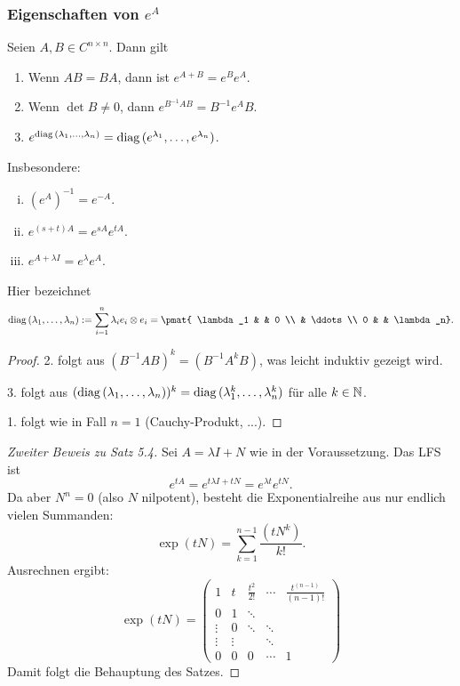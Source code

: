 \subsubsection{Eigenschaften von  \texorpdfstring{$e^A$}{exp(A)}}
\begin{thm}
  Seien $A, B \in C^{n \times n}$. Dann gilt
  \begin{enumerate}
  \item Wenn $AB=BA$, dann ist $e^{A+B} = e^B e^A$.
  \item Wenn $\det B \ne 0$, dann $e^{B^{-1}AB}= B^{-1}e^A B$.
  \item $e^{\mathrm{diag}\,(\lambda_1, \ldots, \lambda_n)} = \mathrm{diag}\,(e^{\lambda_1},
    \ldots, e^{\lambda_n})$.
  \end{enumerate}
  Insbesondere:
  \begin{enumerate}[(i)]
  \item $(e^A)^{-1}= e^{-A}$.
  \item $e^{(s+t)A}= e^{sA}e^{tA}$.
  \item $e^{A+\lambda I}= e^\lambda e^A$.
  \end{enumerate}
\end{thm}
Hier bezeichnet
\[ \diag(\lambda_1, \ldots, \lambda_n) := \sum_{i=1}^n \lambda_i e_i \otimes
  e_i = \pmat{ \lambda_1 & & 0 \\ & \ddots \\ 0 & & \lambda_n}. \]

\begin{proof}
  2. folgt aus $(B^{-1}AB)^k = (B^{-1}A^kB)$, was leicht induktiv gezeigt wird.

  3. folgt aus $(\mathrm{diag}\,(\lambda_1, \ldots, \lambda_n))^k = \mathrm{diag}\,(\lambda_1^k,
  \ldots, \lambda_n^k)$ für alle $k \in \mathbb{N}$.

  1. folgt wie in Fall $n=1$ (Cauchy-Produkt, ...).
\end{proof}

\begin{proof}[Zweiter Beweis zu Satz 5.4]
  Sei $A = \lambda I + N$ wie in der Voraussetzung. Das LFS ist
  \[ e^{tA} = e^{t\lambda I + tN} = e^{\lambda t} e^{tN}. \]
  Da aber $N^n = 0$ (also $N$ nilpotent), besteht die Exponentialreihe
  aus nur endlich vielen Summanden:
  \[ \exp(tN) = \sum_{k=1}^{n-1} \frac{(tN^k)}{k!}. \]
  Ausrechnen ergibt:
  \[ \exp(tN) = \begin{pmatrix}
      1 & t & \frac{t^2}{2!} & \cdots & \frac{t^{(n-1)}}{(n-1)!} \\
      0 & 1 & \ddots\\
      \vdots & 0 & \ddots & \ddots \\
      \vdots & \vdots  & & \ddots \\
      0 & 0 & 0 & \cdots & 1
    \end{pmatrix} \]
  Damit folgt die Behauptung des Satzes.
\end{proof}

